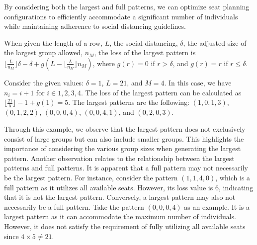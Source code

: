 By considering both the largest and full patterns, we can optimize seat planning configurations to efficiently accommodate a significant number of individuals while maintaining adherence to social distancing guidelines. 


\begin{prop}\label{lem_pattern}
When given the length of a row, $L$, the social distancing, $\delta$, the adjusted size of the largest group allowed, $n_M$, the loss of the largest pattern is $\lfloor \frac{L}{n_M} \rfloor \delta - \delta + g(L - \lfloor \frac{L}{n_M} \rfloor n_M)$, where $g(r) = 0$ if $r > \delta$, and $g(r) = r$ if $r \leq \delta$.
\end{prop}

\begin{example}
Consider the given values: $\delta = 1$, $L = 21$, and $M = 4$. In this case, we have $n_i = i + 1$ for $i \in {1, 2, 3, 4}$. The loss of the largest pattern can be calculated as $\lfloor \frac{21}{5} \rfloor - 1 + g(1) = 5$. The largest patterns are the following: $(1, 0, 1, 3)$, $(0, 1, 2, 2)$, $(0, 0, 0, 4)$, $(0, 0, 4, 1)$, and $(0, 2, 0, 3)$. 
\end{example}


Through this example, we observe that the largest pattern does not exclusively consist of large groups but can also include smaller groups. This highlights the importance of considering the various group sizes when generating the largest pattern. Another observation relates to the relationship between the largest patterns and full patterns. It is apparent that a full pattern may not necessarily be the largest pattern. For instance, consider the pattern $(1, 1, 4, 0)$, which is a full pattern as it utilizes all available seats. However, its loss value is 6, indicating that it is not the largest pattern. Conversely, a largest pattern may also not necessarily be a full pattern. Take the pattern $(0, 0, 0, 4)$ as an example. It is a largest pattern as it can accommodate the maximum number of individuals. However, it does not satisfy the requirement of fully utilizing all available seats since $4 \times 5 \neq 21$.


